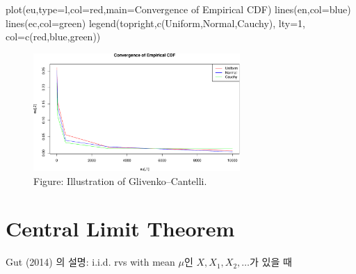 \documentclass[
  13pt,
  letterpaper,
  DIV=11,
  numbers=noendperiod]{scrreprt}
\newenvironment{Shaded}{\begin{snugshade}}{\end{snugshade}}
\newcommand{\AttributeTok}[1]{\textcolor[rgb]{0.40,0.45,0.13}{#1}}
\newcommand{\DecValTok}[1]{\textcolor[rgb]{0.68,0.00,0.00}{#1}}
\newcommand{\FunctionTok}[1]{\textcolor[rgb]{0.28,0.35,0.67}{#1}}
\newcommand{\NormalTok}[1]{\textcolor[rgb]{0.00,0.23,0.31}{#1}}
\newcommand{\StringTok}[1]{\textcolor[rgb]{0.13,0.47,0.30}{#1}}
\theoremstyle{plain}
\theoremstyle{definition}
\theoremstyle{definition}
\theoremstyle{plain}
\theoremstyle{definition}
\theoremstyle{plain}
\theoremstyle{remark}
\begin{document}
\begin{Shaded}
\begin{Highlighting}[]
\FunctionTok{plot}\NormalTok{(eu,}\AttributeTok{type=}\StringTok{\textquotesingle{}l\textquotesingle{}}\NormalTok{,}\AttributeTok{col=}\StringTok{\textquotesingle{}red\textquotesingle{}}\NormalTok{,}\AttributeTok{main=}\StringTok{\textquotesingle{}Convergence of Empirical CDF\textquotesingle{}}\NormalTok{)}
\FunctionTok{lines}\NormalTok{(en,}\AttributeTok{col=}\StringTok{\textquotesingle{}blue\textquotesingle{}}\NormalTok{)}
\FunctionTok{lines}\NormalTok{(ec,}\AttributeTok{col=}\StringTok{\textquotesingle{}green\textquotesingle{}}\NormalTok{)}
\FunctionTok{legend}\NormalTok{(}\StringTok{\textquotesingle{}topright\textquotesingle{}}\NormalTok{,}\FunctionTok{c}\NormalTok{(}\StringTok{\textquotesingle{}Uniform\textquotesingle{}}\NormalTok{,}\StringTok{\textquotesingle{}Normal\textquotesingle{}}\NormalTok{,}\StringTok{\textquotesingle{}Cauchy\textquotesingle{}}\NormalTok{), }\AttributeTok{lty=}\DecValTok{1}\NormalTok{, }\AttributeTok{col=}\FunctionTok{c}\NormalTok{(}\StringTok{\textquotesingle{}red\textquotesingle{}}\NormalTok{,}\StringTok{\textquotesingle{}blue\textquotesingle{}}\NormalTok{,}\StringTok{\textquotesingle{}green\textquotesingle{}}\NormalTok{))}
\end{Highlighting}
\end{Shaded}

\begin{figure}[th]

{\centering \includegraphics[width=0.7\textwidth,height=\textheight]{lln_files/figure-pdf/unnamed-chunk-1-1.pdf}

}

\caption{Figure: Illustration of Glivenko--Cantelli.}

\end{figure}%

\chapter{Central Limit Theorem}\label{sec-clt}

Gut (2014) 의 설명: i.i.d. rvs with mean \(\mu\)인
\(X, X_1, X_2,\ldots\)가 있을 때
\end{document}
